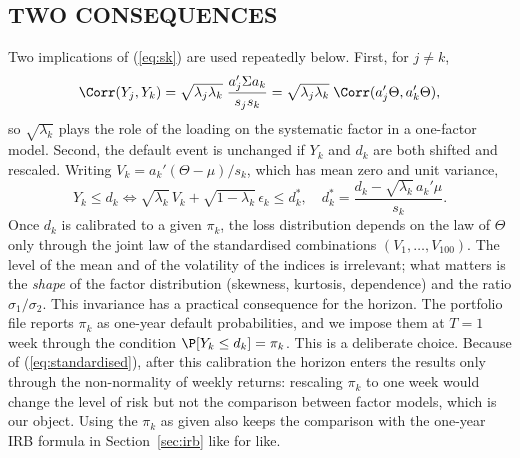 \subsection{TWO CONSEQUENCES}
Two implications of (\ref{eq:sk}) are used repeatedly below. First, for $j\ne k$,
\begin{equation}
\label{eq:assetcorr}
\Corr(Y_j,Y_k)=\sqrt{\lambda_j\lambda_k}\;\frac{a_j'\Sigma a_k}{s_js_k}=\sqrt{\lambda_j\lambda_k}\;\Corr(a_j'\Theta,a_k'\Theta),
\end{equation}
so $\sqrt{\lambda_k}$ plays the role of the loading on the systematic factor in a one-factor model. Second, the default event is unchanged if $Y_k$ and $d_k$ are both shifted and rescaled. Writing $V_k=a_k'(\Theta-\mu)/s_k$, which has mean zero and unit variance,
\begin{equation}
\label{eq:standardised}
Y_k\le d_k\iff \sqrt{\lambda_k}\,V_k+\sqrt{1-\lambda_k}\,\epsilon_k\le d_k^{*},\quad d_k^{*}=\frac{d_k-\sqrt{\lambda_k}\,a_k'\mu}{s_k}.
\end{equation}
Once $d_k$ is calibrated to a given $\pi_k$, the loss distribution depends on the law of $\Theta$ only through the joint law of the standardised combinations $(V_1,\dots,V_{100})$. The level of the mean and of the volatility of the indices is irrelevant; what matters is the \emph{shape} of the factor distribution (skewness, kurtosis, dependence) and the ratio $\sigma_1/\sigma_2$. This invariance has a practical consequence for the horizon. The portfolio file reports $\pi_k$ as one-year default probabilities, and we impose them at $T=1$ week through the condition $\P[Y_k\le d_k]=\pi_k$. This is a deliberate choice. Because of (\ref{eq:standardised}), after this calibration the horizon enters the results only through the non-normality of weekly returns: rescaling $\pi_k$ to one week would change the level of risk but not the comparison between factor models, which is our object. Using the $\pi_k$ as given also keeps the comparison with the one-year IRB formula in Section~\ref{sec:irb} like for like.
